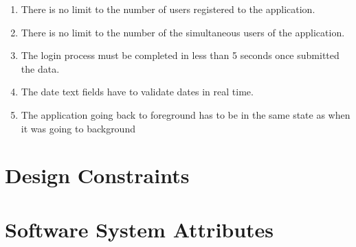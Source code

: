 \begin{enumerate}
\item There is no limit to the number of users registered to the application.
\item There is no limit to the number of the simultaneous users of the application.
\item The login process must be completed in less than 5 seconds once submitted the data.
\item The date text fields have to validate dates in real time.
\item The application going back to foreground has to be in the same state as when it was going to background
\end{enumerate}

\section{Design Constraints}


\section{Software System Attributes}

